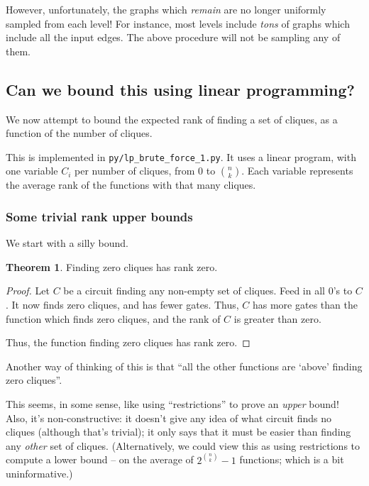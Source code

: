 \documentclass[12pt]{article}
\theoremstyle{definition}
\newtheorem{thm}{Theorem}[section]
\begin{document}
However, unfortunately, the graphs which {\em remain} are no longer uniformly
sampled from each level! For instance, most levels include {\em tons} of
graphs which include all the input edges. The above procedure will not
be sampling any of them.

\subsection{Can we bound this using linear programming?}

We now attempt to bound the expected rank of finding a set
of cliques, as a function of the number of cliques.

This is implemented in
{\tt py/lp\_brute\_force\_1.py}. It uses a linear program, with
one variable $C_i$ per number of cliques, from 0 to ${n \choose k}$.
Each variable represents the average rank of the functions with
that many cliques.

\subsubsection{Some trivial rank upper bounds}

We start with a silly bound.

\begin{thm}
\label{zeroCliques}
Finding zero cliques has rank zero.
\end{thm}
\begin{proof}

Let $C$ be a circuit finding any non-empty set of cliques.
Feed in all 0's to $C$. It now finds zero cliques, and has
fewer gates. Thus, $C$ has more gates than the function
which finds zero cliques, and the rank of $C$ is greater
than zero.

Thus, the function finding zero cliques has rank zero.

\end{proof}
 
Another way of thinking of this is that ``all the other functions
are `above' finding zero cliques''.

This seems, in some sense, like using ``restrictions'' to prove an {\em upper} bound!
Also, it's non-constructive: it doesn't give any idea of what circuit finds no cliques
(although that's trivial); it only says that it must be easier than finding any
{\em other} set of cliques. (Alternatively, we could view this as using restrictions
to compute a lower bound -- on the average of $2^{n \choose k} - 1$ functions; which
is a bit uninformative.)
\end{document}
